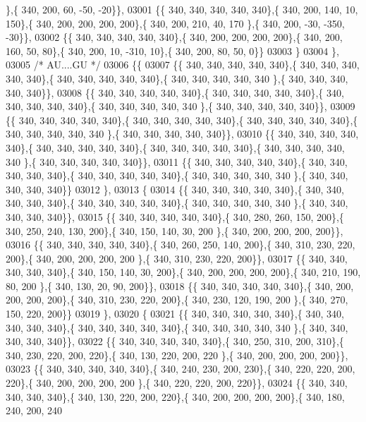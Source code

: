 \begin{DoxyCode}
      \},\{ 340, 200,  60, -50, -20\}\},
03001 \{\{ 340, 340, 340, 340, 340\},\{ 340, 200, 140,  10, 150\},\{ 340, 200, 200, 200, 200\},\{ 340, 200, 210,  40, 170
      \},\{ 340, 200, -30, -350, -30\}\},
03002 \{\{ 340, 340, 340, 340, 340\},\{ 340, 200, 200, 200, 200\},\{ 340, 200, 160,  50,  80\},\{ 340, 200,  10, -310,  
      10\},\{ 340, 200,  80,  50,   0\}\}
03003 \}
03004 \},
03005 \textcolor{comment}{/* AU....GU */}
03006 \{\{
03007 \{\{ 340, 340, 340, 340, 340\},\{ 340, 340, 340, 340, 340\},\{ 340, 340, 340, 340, 340\},\{ 340, 340, 340, 340, 340
      \},\{ 340, 340, 340, 340, 340\}\},
03008 \{\{ 340, 340, 340, 340, 340\},\{ 340, 340, 340, 340, 340\},\{ 340, 340, 340, 340, 340\},\{ 340, 340, 340, 340, 340
      \},\{ 340, 340, 340, 340, 340\}\},
03009 \{\{ 340, 340, 340, 340, 340\},\{ 340, 340, 340, 340, 340\},\{ 340, 340, 340, 340, 340\},\{ 340, 340, 340, 340, 340
      \},\{ 340, 340, 340, 340, 340\}\},
03010 \{\{ 340, 340, 340, 340, 340\},\{ 340, 340, 340, 340, 340\},\{ 340, 340, 340, 340, 340\},\{ 340, 340, 340, 340, 340
      \},\{ 340, 340, 340, 340, 340\}\},
03011 \{\{ 340, 340, 340, 340, 340\},\{ 340, 340, 340, 340, 340\},\{ 340, 340, 340, 340, 340\},\{ 340, 340, 340, 340, 340
      \},\{ 340, 340, 340, 340, 340\}\}
03012 \},
03013 \{
03014 \{\{ 340, 340, 340, 340, 340\},\{ 340, 340, 340, 340, 340\},\{ 340, 340, 340, 340, 340\},\{ 340, 340, 340, 340, 340
      \},\{ 340, 340, 340, 340, 340\}\},
03015 \{\{ 340, 340, 340, 340, 340\},\{ 340, 280, 260, 150, 200\},\{ 340, 250, 240, 130, 200\},\{ 340, 150, 140,  30, 200
      \},\{ 340, 200, 200, 200, 200\}\},
03016 \{\{ 340, 340, 340, 340, 340\},\{ 340, 260, 250, 140, 200\},\{ 340, 310, 230, 220, 200\},\{ 340, 200, 200, 200, 200
      \},\{ 340, 310, 230, 220, 200\}\},
03017 \{\{ 340, 340, 340, 340, 340\},\{ 340, 150, 140,  30, 200\},\{ 340, 200, 200, 200, 200\},\{ 340, 210, 190,  80, 200
      \},\{ 340, 130,  20,  90, 200\}\},
03018 \{\{ 340, 340, 340, 340, 340\},\{ 340, 200, 200, 200, 200\},\{ 340, 310, 230, 220, 200\},\{ 340, 230, 120, 190, 200
      \},\{ 340, 270, 150, 220, 200\}\}
03019 \},
03020 \{
03021 \{\{ 340, 340, 340, 340, 340\},\{ 340, 340, 340, 340, 340\},\{ 340, 340, 340, 340, 340\},\{ 340, 340, 340, 340, 340
      \},\{ 340, 340, 340, 340, 340\}\},
03022 \{\{ 340, 340, 340, 340, 340\},\{ 340, 250, 310, 200, 310\},\{ 340, 230, 220, 200, 220\},\{ 340, 130, 220, 200, 220
      \},\{ 340, 200, 200, 200, 200\}\},
03023 \{\{ 340, 340, 340, 340, 340\},\{ 340, 240, 230, 200, 230\},\{ 340, 220, 220, 200, 220\},\{ 340, 200, 200, 200, 200
      \},\{ 340, 220, 220, 200, 220\}\},
03024 \{\{ 340, 340, 340, 340, 340\},\{ 340, 130, 220, 200, 220\},\{ 340, 200, 200, 200, 200\},\{ 340, 180, 240, 200, 240

\end{DoxyCode}
